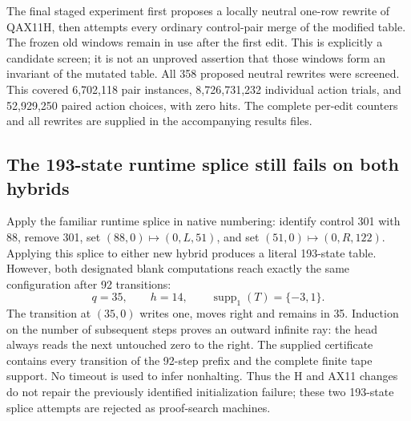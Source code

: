 The final staged experiment first proposes a locally neutral one-row rewrite
of QAX11H, then attempts every ordinary control-pair merge of the modified
table. The frozen old windows remain in use after the first edit. This is
explicitly a candidate screen; it is not an unproved assertion that those
windows form an invariant of the mutated table. All 358 proposed neutral rewrites were screened. This covered
6,702,118 pair instances, 8,726,731,232 individual action trials,
and 52,929,250 paired action choices, with zero hits. The complete
per-edit counters and all rewrites are supplied in the accompanying results
files.

\subsection{The 193-state runtime splice still fails on both hybrids}

Apply the familiar runtime splice in native numbering: identify control 301
with 88, remove 301, set $(88,0)\mapsto(0,L,51)$, and set
$(51,0)\mapsto(0,R,122)$. Applying this splice to either new hybrid produces
a literal 193-state table. However, both designated blank computations reach
exactly the same configuration after 92 transitions:
\[
 q=35,\qquad h=14,\qquad \operatorname{supp}_1(T)=\{-3,1\}.
\]
The transition at $(35,0)$ writes one, moves right and remains in 35.
Induction on the number of subsequent steps proves an outward infinite ray:
the head always reads the next untouched zero to the right. The supplied
certificate contains every transition of the 92-step prefix and the complete
finite tape support. No timeout is used to infer nonhalting. Thus the H and
AX11 changes do not repair the previously identified initialization failure;
these two 193-state splice attempts are rejected as proof-search machines.
